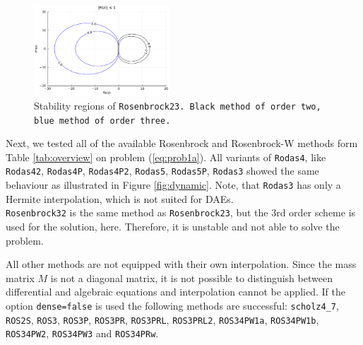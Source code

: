 \documentclass{juliacon}
\begin{document}
\begin{figure}[t]
 \centering
 \includegraphics[width=0.45\textwidth]{stability_rosenbrock23.pdf}
 \caption{Stability regions of \tt Rosenbrock23\rm. Black method of order two, blue method of order three.}\label{fig:stability}
\end{figure}

Next, we tested all of the available Rosenbrock and Rosenbrock-W methods form Table \ref{tab:overview} on problem (\ref{eq:prob1a}).
All variants of \verb|Rodas4|, like \verb|Rodas42|, \verb|Rodas4P|, \verb|Rodas4P2|, \verb|Rodas5|, 
\verb|Rodas5P|, \verb|Rodas3| showed the same behaviour as illustrated in Figure \ref{fig:dynamic}.
Note, that \verb|Rodas3| has only a Hermite interpolation, which is not suited for DAEs.\\

\verb|Rosenbrock32| is the same method as \verb|Rosenbrock23|, but the 3rd order scheme is used for the solution, here. Therefore, it is 
unstable and not able to solve the problem.

All other methods are not equipped with their own interpolation. Since the mass matrix $M$ is not a diagonal matrix, 
it is not possible to distinguish between differential and algebraic equations and interpolation cannot be applied.
If the option \verb|dense=false| is used the following methods are successful:
\verb|scholz4_7|, \verb|ROS2S|, \verb|ROS3|, \verb|ROS3P|,  \verb|ROS3PR|, \verb|ROS3PRL|, \verb|ROS3PRL2|, \verb|ROS34PW1a|, \verb|ROS34PW1b|, \verb|ROS34PW2|, 
\verb|ROS34PW3| and \verb|ROS34PRw|. 
\end{document}
